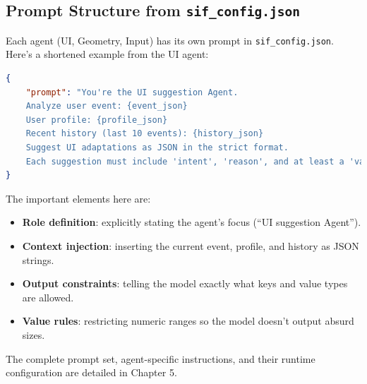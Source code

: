 \documentclass[openany]{book}
\begin{document}
\subsection{Prompt Structure from \texttt{sif\_config.json}}
Each agent (UI, Geometry, Input) has its own prompt in \texttt{sif\_config.json}.\\
Here’s a shortened example from the UI agent:
\begin{lstlisting}[caption=Example UI Agent Prompt, language=json]
{
    "prompt": "You're the UI suggestion Agent.  
    Analyze user event: {event_json}  
    User profile: {profile_json}  
    Recent history (last 10 events): {history_json}  
    Suggest UI adaptations as JSON in the strict format.  
    Each suggestion must include 'intent', 'reason', and at least a 'value' and 'mode' field. Value must be a reasonable number (e.g., 1.2) with at most one decimal place, and represents a scaling value unless stated otherwise in the metadata (e.g. font size). Target can be 'all' or specific elements."
}
\end{lstlisting}
The important elements here are:
\begin{itemize}
    \item \textbf{Role definition}: explicitly stating the agent’s focus (“UI suggestion Agent”).
    \item \textbf{Context injection}: inserting the current event, profile, and history as JSON strings.
    \item \textbf{Output constraints}: telling the model exactly what keys and value types are allowed.
    \item \textbf{Value rules}: restricting numeric ranges so the model doesn’t output absurd sizes.
\end{itemize}
The complete prompt set, agent-specific instructions, and their runtime configuration are detailed in Chapter 5.
\end{document}
